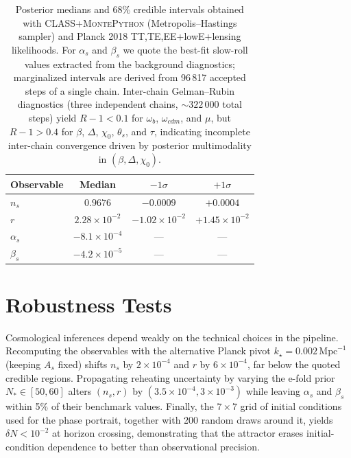 \documentclass[11pt,a4paper]{article}
\begin{document}
\begin{table}[t]
    \centering
    \caption{Posterior medians and 68\% credible intervals obtained with \textsc{CLASS}+\textsc{MontePython} (Metropolis--Hastings sampler) and Planck 2018 TT,TE,EE+lowE+lensing likelihoods. For $\alpha_{s}$ and $\beta_{s}$ we quote the best-fit slow-roll values extracted from the background diagnostics; marginalized intervals are derived from 96\,817 accepted steps of a single chain. Inter-chain Gelman--Rubin diagnostics (three independent chains, ${\sim}322\,000$ total steps) yield $R{-}1<0.1$ for $\omega_b$, $\omega_{cdm}$, and $\mu$, but $R{-}1>0.4$ for $\beta$, $\Delta$, $\chi_0$, $\theta_s$, and $\tau$, indicating incomplete inter-chain convergence driven by posterior multimodality in $(\beta,\Delta,\chi_0)$.}
    \begin{tabular}{lccc}
        \toprule
        Observable & Median & $-1\sigma$ & $+1\sigma$ \\
        \midrule
        $n_{s}$ & $0.9676$ & $-0.0009$ & $+0.0004$ \\
        $r$ & $2.28\times10^{-2}$ & $-1.02\times10^{-2}$ & $+1.45\times10^{-2}$ \\
        $\alpha_{s}$ & $-8.1\times10^{-4}$ & --- & --- \\
        $\beta_{s}$ & $-4.2\times10^{-5}$ & --- & --- \\
        \bottomrule
    \end{tabular}
    \label{tab:observables}
\end{table}

\section{Robustness Tests}
\label{sec:robustness}
Cosmological inferences depend weakly on the technical choices in the pipeline. Recomputing the observables with the alternative Planck pivot $k_{\star}=0.002\,\mathrm{Mpc}^{-1}$ (keeping $A_{s}$ fixed) shifts $n_{s}$ by $2\times10^{-4}$ and $r$ by $6\times10^{-4}$, far below the quoted credible regions. Propagating reheating uncertainty by varying the e-fold prior $N_{*}\in[50,60]$ alters $(n_{s},r)$ by $(3.5\times10^{-4},3\times10^{-3})$ while leaving $\alpha_{s}$ and $\beta_{s}$ within 5\% of their benchmark values. Finally, the $7\times7$ grid of initial conditions used for the phase portrait, together with 200 random draws around it, yields $\delta N<10^{-2}$ at horizon crossing, demonstrating that the attractor erases initial-condition dependence to better than observational precision.
\end{document}
